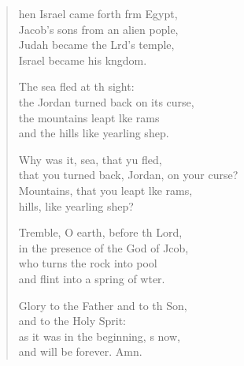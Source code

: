 \settowidth{\versewidth}{that you turned back, Jordan, on your course?}
\begin{verse}%
  \begin{patverse}
hen Israel came forth frm Egypt,\Med\\
Jacob’s sons from an alien pople,\\
Judah became the Lrd’s temple,\Med\\
Israel became his k\pointup{\i}ngdom.

The sea fled at th sight:\Med\\
the Jordan turned back on its curse,\\
the mountains leapt l\pointup{\i}ke rams\Med\\
and the hills like yearling shep.

Why was it, sea, that yu fled,\Med\\
that you turned back, Jordan, on your curse?\\
Mountains, that you leapt l\pointup{\i}ke rams,\Med\\
hills, like yearling shep?

Tremble, O earth, before th Lord,\Med\\
in the presence of the God of Jcob,\\
who turns the rock into  pool\Med\\
and flint into a spring of wter.

Glory to the Father and to th Son,\Med\\
and to the Holy Sp\pointup{\i}rit:\\
as it was in the beginning, \pointup{\i}s now,\Med\\
and will be forever. Amn.
  \end{patverse}
\end{verse}
